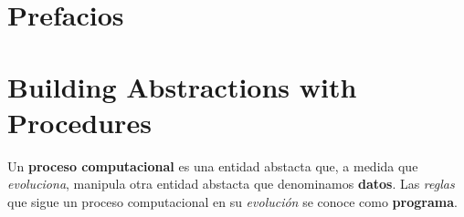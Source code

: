 \setcounter{section}{-1}

\section{Prefacios}

\section{Building Abstractions with Procedures}

Un \textbf{proceso computacional} es una entidad abstacta que,
a medida que \textit{evoluciona},
manipula otra entidad abstacta que denominamos \textbf{datos}.
Las \textit{reglas} que sigue un proceso computacional 
en su \textit{evolución} se conoce como 
\textbf{programa}.